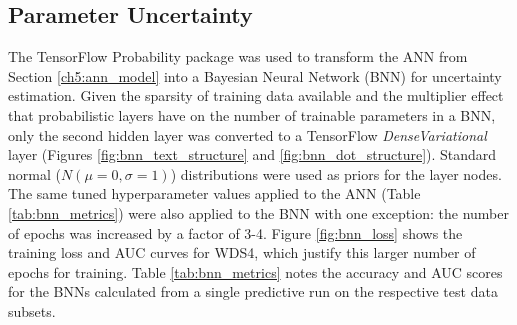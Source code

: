 \subsection{Parameter Uncertainty}\label{ch5:param_uncertainty}

The TensorFlow Probability package \citep{dillon_tensorflow_2017} was used to transform the ANN from Section \ref{ch5:ann_model} into a Bayesian Neural Network (BNN) for uncertainty estimation. Given the sparsity of training data available and the multiplier effect that probabilistic layers have on the number of trainable parameters in a BNN, only the second hidden layer was converted to a TensorFlow \textit{DenseVariational} layer (Figures \ref{fig:bnn_text_structure} and \ref{fig:bnn_dot_structure}). Standard normal ($N(\mu=0, \sigma=1)$) distributions were used as priors for the layer nodes. The same tuned hyperparameter values applied to the ANN (Table \ref{tab:bnn_metrics}) were also applied to the BNN with one exception: the number of epochs was increased by a factor of 3-4. Figure \ref{fig:bnn_loss} shows the training loss and AUC curves for WDS4, which justify this larger number of epochs for training. Table \ref{tab:bnn_metrics} notes the accuracy and AUC scores for the BNNs calculated from a single predictive run on the respective test data subsets.

